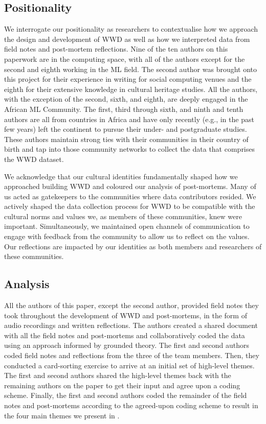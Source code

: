 
\subsection{Positionality}
We interrogate our positionality as researchers to contextualise how we approach the design and development of \textsc{WWD} as well as how we interpreted data from field notes and post-mortem reflections. Nine of the ten authors on this paperwork are in the computing space, with all of the authors except for the second and eighth working in the ML field. The second author was brought onto this project for their experience in writing for social computing venues and the eighth for their extensive knowledge in cultural heritage studies. All the authors, with the exception of the second, sixth, and eighth, are deeply engaged in the African ML Community. The first, third through sixth, and ninth and tenth authors are all from countries in Africa and have only recently (e.g., in the past few years) left the continent to pursue their under- and postgraduate studies. These authors maintain strong ties with their communities in their country of birth and tap into those community networks to collect the data that comprises the \textsc{WWD} dataset. 

We acknowledge that our cultural identities fundamentally shaped how we approached building \textsc{WWD} and coloured our analysis of post-mortems. Many of us acted as gatekeepers to the communities where data contributors resided. We actively shaped the data collection process for \textsc{WWD} to be compatible with the cultural norms and values we, as members of these communities, knew were important. Simultaneously, we maintained open channels of communication to engage with feedback from the community to allow us to reflect on the values. Our reflections are impacted by our identities as both members and researchers of these communities.  

\subsection{Analysis}
All the authors of this paper, except the second author, provided field notes they took throughout the development of \textsc{WWD} and post-mortems, in the form of audio recordings and written reflections. The authors created a shared document with all the field notes and post-mortems and collaboratively coded the data using an approach informed by grounded theory. The first and second authors coded field notes and reflections from the three of the team members. Then, they conducted a card-sorting exercise to arrive at an initial set of high-level themes. The first and second authors shared the high-level themes back with the remaining authors on the paper to get their input and agree upon a coding scheme. Finally, the first and second authors coded the remainder of the field notes and post-mortems according to the agreed-upon coding scheme to result in the four main themes we present in .

